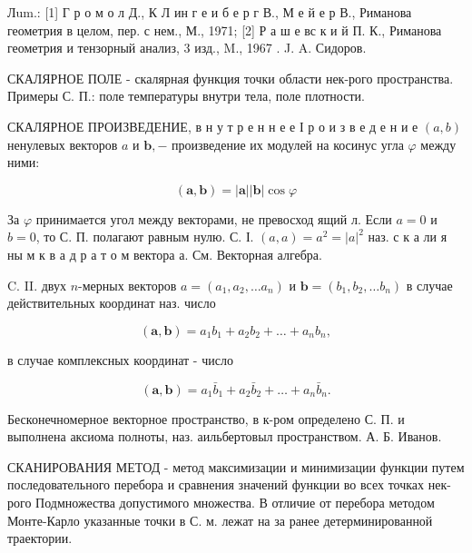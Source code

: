 \documentclass[10pt]{article}
\begin{document}
Лum.: [1] Г р о м о л Д., К Л ин г е и б е р г В., М е й е р В., Риманова геометрия в целом, пер. с нем., М., 1971; [2] Р а ш е вс к и й П. К., Риманова геометрия и тензорный анализ, 3 изд., M., 1967 . J. A. Сидоров.



СКАЛЯРНОЕ ПОЛЕ - скалярная функция точки области нек-рого пространства. Примеры С. П.: поле температуры внутри тела, поле плотности.



СКАЛЯРНОЕ ПРОИЗВЕДЕНИЕ, в н у т р е н н е е І р о и з в е д е н и е $(a, b)$ ненулевых векторов $a$ и $\boldsymbol{b},-$ произведение их модулей на косинус угла $\varphi$ между ними:



\[

(\boldsymbol{a}, \boldsymbol{b})=|\boldsymbol{a}||\boldsymbol{b}| \cos \varphi

\]



За $\varphi$ принимается угол между векторами, не превосход ящий л. Если $a=0$ и $b=0$, то С. П. полагают равным нулю. С. І. $(a, a)=a^{2}=|a|^{2}$ наз. с к а ли я ны м к в а д р а т о м вектора $а$. См. Векторная алгебра.



C. II. двух $n$-мерных векторов $a=\left(a_{1}, a_{2}, \ldots a_{n}\right)$ и $\boldsymbol{b}=\left(b_{1}, b_{2}, \ldots b_{n}\right)$ в случае действительных координат наз. число



\[

(\boldsymbol{a}, \boldsymbol{b})=a_{1} b_{1}+a_{2} b_{2}+\ldots+a_{n} b_{n},

\]



в случае комплексных координат - число



\[

(\boldsymbol{a}, \boldsymbol{b})=a_{1} \bar{b}_{1}+a_{2} \bar{b}_{2}+\ldots+a_{n} \bar{b}_{n} .

\]



Бесконечномерное векторное пространство, в к-ром определено С. П. и выполнена аксиома полноты, наз. аильбертовыл пространством. А. Б. Иванов.



СКАНИРОВАНИЯ МЕТОД - метод максимизации и минимизации функции путем последовательного перебора и сравнения значений функции во всех точках нек-рого Подмножества допустимого множества. В отличие от перебора методом Монте-Карло указанные точки в С. м. лежат на за ранее детерминированной траектории.
\end{document}
